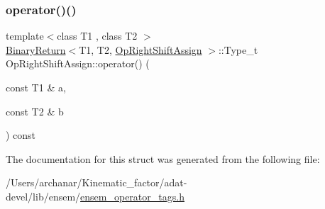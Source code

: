 \subsubsection{\texorpdfstring{operator()()}{operator()()}\hspace{0.1cm}{\footnotesize\ttfamily [3/3]}}
{\footnotesize\ttfamily template$<$class T1 , class T2 $>$ \\
\mbox{\hyperlink{structBinaryReturn}{Binary\+Return}}$<$T1, T2, \mbox{\hyperlink{structOpRightShiftAssign}{Op\+Right\+Shift\+Assign}} $>$\+::Type\+\_\+t Op\+Right\+Shift\+Assign\+::operator() (\begin{DoxyParamCaption}\item[{const T1 \&}]{a,  }\item[{const T2 \&}]{b }\end{DoxyParamCaption}) const\hspace{0.3cm}{\ttfamily [inline]}}



The documentation for this struct was generated from the following file\+:\begin{DoxyCompactItemize}
\item 
/\+Users/archanar/\+Kinematic\+\_\+factor/adat-\/devel/lib/ensem/\mbox{\hyperlink{adat-devel_2lib_2ensem_2ensem__operator__tags_8h}{ensem\+\_\+operator\+\_\+tags.\+h}}\end{DoxyCompactItemize}
